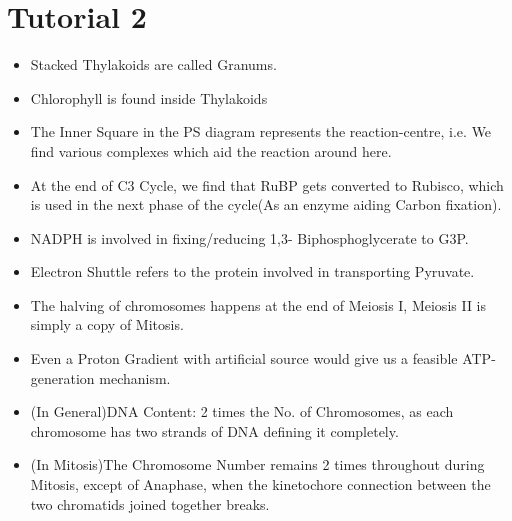 \documentclass{article}
\begin{document}
\section{Tutorial 2}
\begin{itemize}
  \item Stacked Thylakoids are called Granums.
  \item Chlorophyll is found inside Thylakoids
  \item The Inner Square in the PS diagram represents the reaction-centre, i.e. We find various complexes which aid the reaction around here.
  \item At the end of C3 Cycle, we find that RuBP gets converted to Rubisco, which is used in the next phase of the cycle(As an enzyme aiding Carbon fixation).
  \item NADPH is involved in fixing/reducing 1,3- Biphosphoglycerate to G3P.
  \item Electron Shuttle refers to the protein involved in transporting Pyruvate.
  \item The halving of chromosomes happens at the end of Meiosis I, Meiosis II is simply a copy of Mitosis.
  \item Even a Proton Gradient with artificial source would give us a feasible ATP-generation mechanism.
  \item (In General)DNA Content: 2 times the No. of Chromosomes, as each chromosome has two strands of DNA defining it completely.
  \item (In Mitosis)The Chromosome Number remains 2 times throughout during Mitosis, except of Anaphase, when the kinetochore connection between the two chromatids joined together breaks.


\end{itemize}
\end{document}
